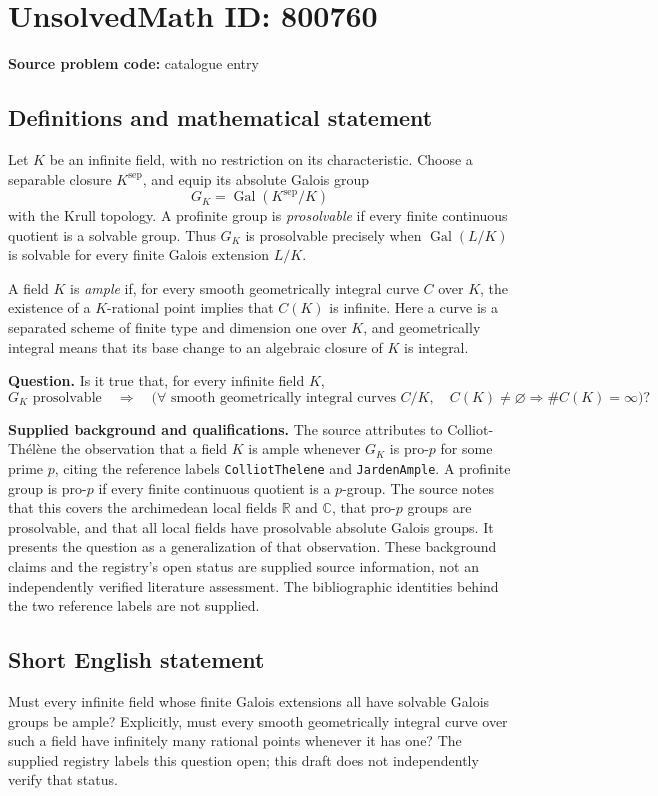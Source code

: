 \documentclass[11pt]{article}
\newcommand{\R}{\mathbb{R}}
\newcommand{\C}{\mathbb{C}}
\begin{document}
\section*{UnsolvedMath ID: 800760}
\textbf{Source problem code:} catalogue entry
\subsection{Definitions and mathematical statement}
Let \(K\) be an infinite field, with no restriction on its characteristic. Choose a separable closure \(K^{\mathrm{sep}}\), and equip its absolute Galois group
\[
G_K=\operatorname{Gal}(K^{\mathrm{sep}}/K)
\]
with the Krull topology. A profinite group is \emph{prosolvable} if every finite continuous quotient is a solvable group. Thus \(G_K\) is prosolvable precisely when \(\operatorname{Gal}(L/K)\) is solvable for every finite Galois extension \(L/K\).

A field \(K\) is \emph{ample} if, for every smooth geometrically integral curve \(C\) over \(K\), the existence of a \(K\)-rational point implies that \(C(K)\) is infinite. Here a curve is a separated scheme of finite type and dimension one over \(K\), and geometrically integral means that its base change to an algebraic closure of \(K\) is integral.

\textbf{Question.} Is it true that, for every infinite field \(K\),
\[
G_K\text{ prosolvable}
\quad\Longrightarrow\quad
\bigl(\forall\text{ smooth geometrically integral curves }C/K,\quad C(K)\ne\varnothing\Longrightarrow \#C(K)=\infty\bigr)?
\]

\textbf{Supplied background and qualifications.} The source attributes to Colliot-Th\'el\`ene the observation that a field \(K\) is ample whenever \(G_K\) is pro-\(p\) for some prime \(p\), citing the reference labels \texttt{ColliotThelene} and \texttt{JardenAmple}. A profinite group is pro-\(p\) if every finite continuous quotient is a \(p\)-group. The source notes that this covers the archimedean local fields \(\R\) and \(\C\), that pro-\(p\) groups are prosolvable, and that all local fields have prosolvable absolute Galois groups. It presents the question as a generalization of that observation. These background claims and the registry's open status are supplied source information, not an independently verified literature assessment. The bibliographic identities behind the two reference labels are not supplied.
\subsection{Short English statement}
Must every infinite field whose finite Galois extensions all have solvable Galois groups be ample? Explicitly, must every smooth geometrically integral curve over such a field have infinitely many rational points whenever it has one? The supplied registry labels this question open; this draft does not independently verify that status.
\end{document}

